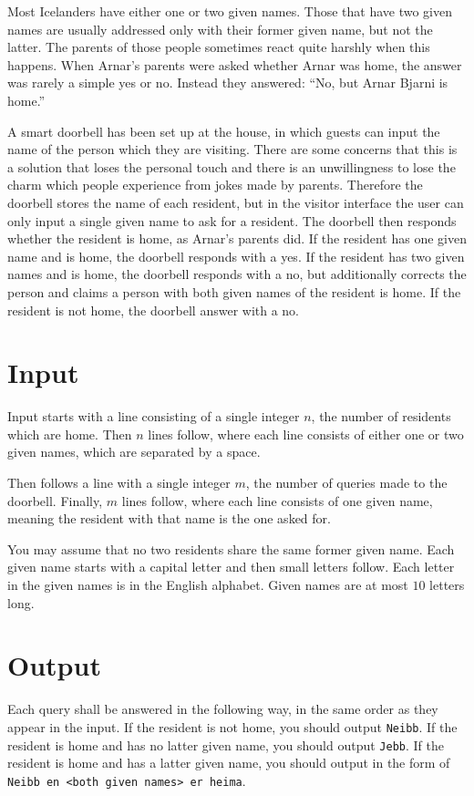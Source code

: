 
Most Icelanders have either one or two given names.
Those that have two given names are usually addressed only with their former given name, but not the latter.
The parents of those people sometimes react quite harshly when this happens.
When Arnar's parents were asked whether Arnar was home, the answer was rarely a simple yes or no.
Instead they answered: ``No, but Arnar Bjarni is home.''

A smart doorbell has been set up at the house, in which guests can input the name of the person which they are visiting.
There are some concerns that this is a solution that loses the personal touch and there is an unwillingness to lose the charm which people experience from jokes made by parents.
Therefore the doorbell stores the name of each resident, but in the visitor interface the user can only input a single given name to ask for a resident.
The doorbell then responds whether the resident is home, as Arnar's parents did.
If the resident has one given name and is home, the doorbell responds with a yes.
If the resident has two given names and is home, the doorbell responds with a no, but additionally corrects the person and claims a person with both given names of the resident is home.
If the resident is not home, the doorbell answer with a no.

\section*{Input}
Input starts with a line consisting of a single integer $n$, the number of residents which are home.
Then $n$ lines follow, where each line consists of either one or two given names, which are separated by a space.

Then follows a line with a single integer $m$, the number of queries made to the doorbell.
Finally, $m$ lines follow, where each line consists of one given name, meaning the resident with that name is the one asked for.

You may assume that no two residents share the same former given name.
Each given name starts with a capital letter and then small letters follow.
Each letter in the given names is in the English alphabet.
Given names are at most $10$ letters long.

\section*{Output}
Each query shall be answered in the following way, in the same order as they appear in the input.
If the resident is not home, you should output \texttt{Neibb}.
If the resident is home and has no latter given name, you should output \texttt{Jebb}.
If the resident is home and has a latter given name, you should output in the form of \texttt{Neibb en <both given names> er heima}.

